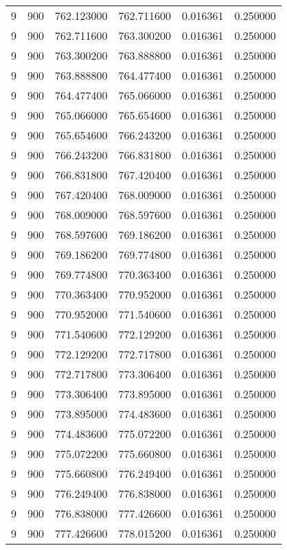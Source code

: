 \begin{longtable}{rrrrrr}
9 & 900 & 762.123000 & 762.711600 & 0.016361 & 0.250000 \\
9 & 900 & 762.711600 & 763.300200 & 0.016361 & 0.250000 \\
9 & 900 & 763.300200 & 763.888800 & 0.016361 & 0.250000 \\
9 & 900 & 763.888800 & 764.477400 & 0.016361 & 0.250000 \\
9 & 900 & 764.477400 & 765.066000 & 0.016361 & 0.250000 \\
9 & 900 & 765.066000 & 765.654600 & 0.016361 & 0.250000 \\
9 & 900 & 765.654600 & 766.243200 & 0.016361 & 0.250000 \\
9 & 900 & 766.243200 & 766.831800 & 0.016361 & 0.250000 \\
9 & 900 & 766.831800 & 767.420400 & 0.016361 & 0.250000 \\
9 & 900 & 767.420400 & 768.009000 & 0.016361 & 0.250000 \\
9 & 900 & 768.009000 & 768.597600 & 0.016361 & 0.250000 \\
9 & 900 & 768.597600 & 769.186200 & 0.016361 & 0.250000 \\
9 & 900 & 769.186200 & 769.774800 & 0.016361 & 0.250000 \\
9 & 900 & 769.774800 & 770.363400 & 0.016361 & 0.250000 \\
9 & 900 & 770.363400 & 770.952000 & 0.016361 & 0.250000 \\
9 & 900 & 770.952000 & 771.540600 & 0.016361 & 0.250000 \\
9 & 900 & 771.540600 & 772.129200 & 0.016361 & 0.250000 \\
9 & 900 & 772.129200 & 772.717800 & 0.016361 & 0.250000 \\
9 & 900 & 772.717800 & 773.306400 & 0.016361 & 0.250000 \\
9 & 900 & 773.306400 & 773.895000 & 0.016361 & 0.250000 \\
9 & 900 & 773.895000 & 774.483600 & 0.016361 & 0.250000 \\
9 & 900 & 774.483600 & 775.072200 & 0.016361 & 0.250000 \\
9 & 900 & 775.072200 & 775.660800 & 0.016361 & 0.250000 \\
9 & 900 & 775.660800 & 776.249400 & 0.016361 & 0.250000 \\
9 & 900 & 776.249400 & 776.838000 & 0.016361 & 0.250000 \\
9 & 900 & 776.838000 & 777.426600 & 0.016361 & 0.250000 \\
9 & 900 & 777.426600 & 778.015200 & 0.016361 & 0.250000 \\

\end{longtable}
